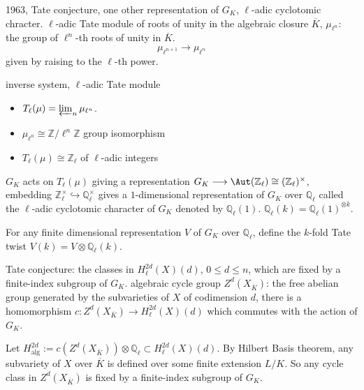 1963, Tate conjecture, one other representation of $G_K$, $\ell$-adic cyclotomic chracter. $\ell$-adic Tate module of roots of unity in the algebraic closure $\overline{K}$, $\mu_{\ell^n}$: the group of $\ell^n$-th roots of unity in $\overline{K}$.
\[\mu_{\ell^{n+1}}\longrightarrow \mu_{\ell^n}\]
given by raising to the $\ell$-th power.

inverse system, $\ell$-adic Tate module 
\begin{itemize}
	\item $T_\ell(\mu)=\varprojlim_n \mu_{\ell^n}$.
	\item $\mu_{\ell^n}\cong \mathbb{Z}/\ell^n \mathbb{Z}$ group isomorphism
	\item $T_\ell(\mu)\cong \mathbb{Z}_\ell$ of $\ell$-adic integers
\end{itemize}
$G_K$ acts on $T_\ell(\mu)$ giving a representation $G_K\longrightarrow \Aut(\mathbb{Z}_\ell)\cong (\mathbb{Z}_\ell)^{\times}$, embedding $\mathbb{Z}_\ell^\times \hookrightarrow \mathbb{Q}_\ell^\times$ gives a $1$-dimensional representation of $G_K$ over $\mathbb{Q}_\ell$ called the $\ell$-adic cyclotomic character of $G_K$ denoted by $\mathbb{Q}_\ell(1)$. $\mathbb{Q}_\ell(k)=\mathbb{Q}_\ell(1)^{\otimes k}$.

For any finite dimensional representation $V$ of $G_K$ over $\mathbb{Q}_\ell$, define the $k$-fold Tate twist $V(k)=V\otimes \mathbb{Q}_\ell(k)$.

Tate conjecture: the classes in $H_\ell^{2d}(X)(d)$, $0\leq d \leq n$, which are fixed by a finite-index subgroup of $G_K$.
algebraic cycle group $Z^d(X_{\overline{K}})$: the free abelian group generated by the subvarieties of $X$ of codimension $d$, there is a homomorphism $c\colon Z^d(X_{\overline{K}})\longrightarrow H_\ell^{2d}(X)(d)$ which commutes with the action of $G_K$.

Let $H_{\text{alg}}^{2d}:=c(Z^d(X_{\overline{K}}))\otimes \mathbb{Q}_\ell \subset H_\ell^{2d}(X)(d)$. By Hilbert Basis theorem, any subvariety of $X$ over $\overline{K}$ is defined over some finite extension $L/K$. So any cycle class in $Z^d(X_{\overline{K}})$ is fixed by a finite-index subgroup of $G_K$.

